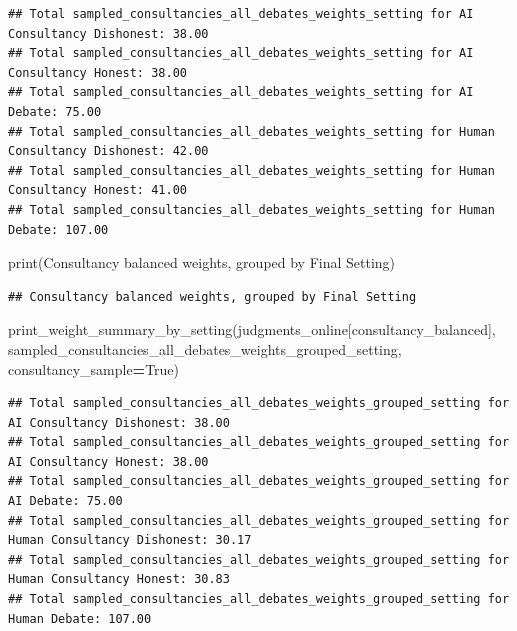 \documentclass[
]{article}
\newenvironment{Shaded}{\begin{snugshade}}{\end{snugshade}}
\newcommand{\BuiltInTok}[1]{#1}
\newcommand{\NormalTok}[1]{#1}
\newcommand{\OperatorTok}[1]{\textcolor[rgb]{0.81,0.36,0.00}{\textbf{#1}}}
\newcommand{\StringTok}[1]{\textcolor[rgb]{0.31,0.60,0.02}{#1}}
\newcommand{\VariableTok}[1]{\textcolor[rgb]{0.00,0.00,0.00}{#1}}
\begin{document}
\begin{verbatim}
## Total sampled_consultancies_all_debates_weights_setting for AI Consultancy Dishonest: 38.00
## Total sampled_consultancies_all_debates_weights_setting for AI Consultancy Honest: 38.00
## Total sampled_consultancies_all_debates_weights_setting for AI Debate: 75.00
## Total sampled_consultancies_all_debates_weights_setting for Human Consultancy Dishonest: 42.00
## Total sampled_consultancies_all_debates_weights_setting for Human Consultancy Honest: 41.00
## Total sampled_consultancies_all_debates_weights_setting for Human Debate: 107.00
\end{verbatim}

\begin{Shaded}
\begin{Highlighting}[]
\BuiltInTok{print}\NormalTok{(}\StringTok{\textquotesingle{}Consultancy balanced weights, grouped by Final Setting\textquotesingle{}}\NormalTok{)}
\end{Highlighting}
\end{Shaded}

\begin{verbatim}
## Consultancy balanced weights, grouped by Final Setting
\end{verbatim}

\begin{Shaded}
\begin{Highlighting}[]
\NormalTok{print\_weight\_summary\_by\_setting(judgments\_online[consultancy\_balanced], }\StringTok{\textquotesingle{}sampled\_consultancies\_all\_debates\_weights\_grouped\_setting\textquotesingle{}}\NormalTok{, consultancy\_sample}\OperatorTok{=}\VariableTok{True}\NormalTok{)}
\end{Highlighting}
\end{Shaded}

\begin{verbatim}
## Total sampled_consultancies_all_debates_weights_grouped_setting for AI Consultancy Dishonest: 38.00
## Total sampled_consultancies_all_debates_weights_grouped_setting for AI Consultancy Honest: 38.00
## Total sampled_consultancies_all_debates_weights_grouped_setting for AI Debate: 75.00
## Total sampled_consultancies_all_debates_weights_grouped_setting for Human Consultancy Dishonest: 30.17
## Total sampled_consultancies_all_debates_weights_grouped_setting for Human Consultancy Honest: 30.83
## Total sampled_consultancies_all_debates_weights_grouped_setting for Human Debate: 107.00
\end{verbatim}
\end{document}
